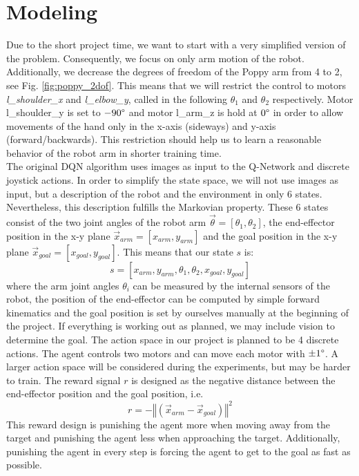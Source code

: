 \documentclass[a4paper,twoside, openright,12pt]{report}
\begin{document}
\chapter{Modeling} \label{sec:modeling}
Due to the short project time, we want to start with a very simplified version of the problem. Consequently, we focus on only arm motion of the robot. Additionally, we decrease the degrees of freedom of the Poppy arm from 4 to 2, see Fig. \ref{fig:poppy_2dof}. This means that we will restrict the control to motors \textit{l\_shoulder\_x} and \textit{l\_elbow\_y}, called in the following $\theta_1$ and $\theta_2$ respectively. Motor l\_shoulder\_y is set to $-90\degree$ and motor l\_arm\_z is hold at $0\degree$ in order to allow movements of the hand only in the x-axis (sideways) and y-axis (forward/backwards). This restriction should help us to learn a reasonable behavior of the robot arm in shorter training time. \\
The original \ac{DQN} algorithm uses images as input to the Q-Network and discrete joystick actions. In order to simplify the state space, we will not use images as input, but a description of the robot and the environment in only 6 states. Nevertheless, this description fulfills the Markovian property. These 6 states consist of the two joint angles of the robot arm $\vec{\theta} = [\theta_1, \theta_2]$, the end-effector position in the x-y plane $\vec{x}_{arm} = [x_{arm}, y_{arm}]$ and the goal position in the x-y plane $\vec{x}_{goal} = [x_{goal}, y_{goal}]$. This means that our state $s$ is:
\begin{equation}
s = [x_{arm}, y_{arm}, \theta_1, \theta_2, x_{goal}, y_{goal}]
\end{equation} 
where the arm joint angles $\theta_i$ can be measured by the internal sensors of the robot, the position of the end-effector can be computed by simple forward kinematics and the goal position is set by ourselves manually at the beginning of the project. If everything is working out as planned, we may include vision to determine the goal. The action space in our project is planned to be 4 discrete actions. The agent controls two motors and can move each motor with $\pm1\degree$. A larger action space will be considered during the experiments, but may be harder to train. The reward signal $r$ is designed as the negative distance between the end-effector position and the goal position, i.e.
\begin{equation}
r = -\left\Vert\left( \vec{x}_{arm} - \vec{x}_{goal} \right) \right\Vert^2
\end{equation}
This reward design is punishing the agent more when moving away from the target and punishing the agent less when approaching the target. Additionally, punishing the agent in every step is forcing the agent to get to the goal as fast as possible.\\
\end{document}
